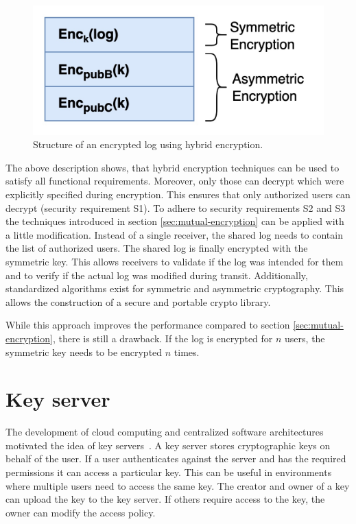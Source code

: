 \documentclass[../main.tex]{subfiles}
\begin{document}
\begin{figure}[ht]
    \includegraphics[scale=0.2]{../img/04/hybrid_encryption.jpg}
    \centering
    \caption{Structure of an encrypted log using hybrid encryption.}
    \label{fig:hybrid_encryption}
\end{figure}

The above description shows, that hybrid encryption techniques can be used to satisfy all functional requirements.
Moreover, only those can decrypt which were explicitly specified during encryption.
This ensures that only authorized users can decrypt (security requirement S1).
To adhere to security requirements S2 and S3 the techniques introduced in section \ref{sec:mutual-encryption} can be applied with a little modification.
Instead of a single receiver, the shared log needs to contain the list of authorized users.
The shared log is finally encrypted with the symmetric key.
This allows receivers to validate if the log was intended for them and to verify if the actual log was modified during transit.
Additionally, standardized algorithms exist for symmetric and asymmetric cryptography.
This allows the construction of a secure and portable crypto library.

While this approach improves the performance compared to section \ref{sec:mutual-encryption}, there is still a drawback.
If the log is encrypted for $n$ users, the symmetric key needs to be encrypted $n$ times.

\section{Key server}
\label{sec:key-server}

The development of cloud computing and centralized software architectures motivated the idea of key servers~\cite{Seitz2003}.
A key server stores cryptographic keys on behalf of the user.
If a user authenticates against the server and has the required permissions it can access a particular key.
This can be useful in environments where multiple users need to access the same key.
The creator and owner of a key can upload the key to the key server.
If others require access to the key, the owner can modify the access policy.
\end{document}
